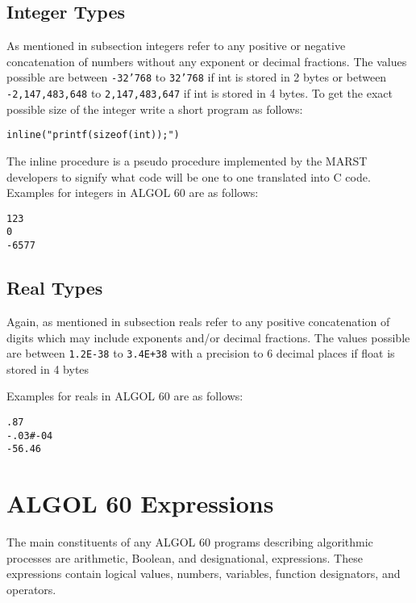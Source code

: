 \documentclass{article}
\begin{document}
\subsection{Integer Types}
As mentioned in subsection  integers refer to any positive or negative concatenation of numbers without any exponent or decimal fractions. The values possible are between \texttt{-32'768} to \texttt{32'768} if int is stored in 2 bytes or between \texttt{-2,147,483,648} to \texttt{2,147,483,647} if int is stored in 4 bytes. To get the exact possible size of the integer write a short program as follows:

\begin{lstlisting}[language={[60]algol}]
inline("printf(sizeof(int));")
\end{lstlisting}

The inline procedure is a pseudo procedure implemented by the MARST developers to signify what code will be one to one translated into C code. \\

Examples for integers in ALGOL 60 are as follows:

\begin{lstlisting}[language={[60]algol}]
123
0
-6577
\end{lstlisting}

\subsection{Real Types}
Again, as mentioned in subsection  reals refer to any positive concatenation of digits which may include exponents and/or decimal fractions. The values possible are between \texttt{1.2E-38} to \texttt{3.4E+38} with a precision to 6 decimal places if float is stored in 4 bytes

Examples for reals in ALGOL 60 are as follows:

\begin{lstlisting}[language={[60]algol}]
.87
-.03#-04
-56.46
\end{lstlisting}

\newpage

\section{ALGOL 60 Expressions}
The main constituents of any ALGOL 60 programs describing algorithmic processes are arithmetic, Boolean, and designational, expressions. These expressions contain logical values, numbers, variables, function designators, and operators.
\end{document}
